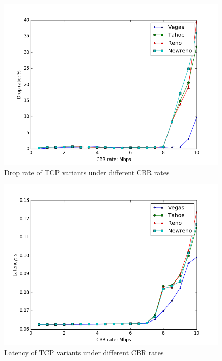 \documentclass[10pt, conference]{IEEEtran/IEEEtran}
\begin{document}
\begin{figure}[htbp]
\begin{center}
\includegraphics[width=\linewidth]{../exp1/exp1_drop.png}
\caption{Drop rate of TCP variants under different CBR rates}
\label{exp1_drop}
\end{center}
\end{figure}

\begin{figure}[htbp]
\begin{center}
\includegraphics[width=\linewidth]{../exp1/exp1_lat.png}
\caption{Latency of TCP variants under different CBR rates}
\label{exp1_lat}
\end{center}
\end{figure}
\end{document}
